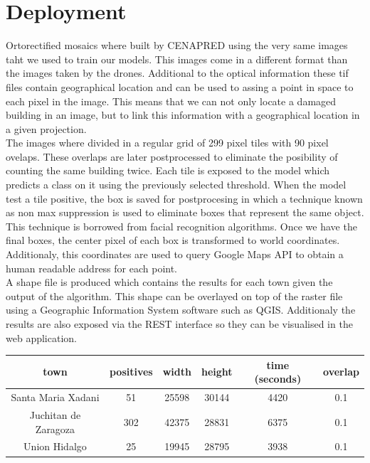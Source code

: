 \section{Deployment}

Ortorectified mosaics where built by CENAPRED using the very same images taht we used to train our models. This images come in a different format than the images taken by the drones. Additional to the optical information these tif files contain geographical location and can be used to assing a point in space to each pixel in the image. This means that we can not only locate a damaged building in an image, but to link this information with a geographical location in a given projection.\\

The images where divided in a regular grid of 299 pixel tiles with 90 pixel ovelaps. These overlaps are later postprocessed to eliminate the posibility of counting the same building twice. Each tile is exposed to the model which predicts a class on it using the previously selected threshold. When the model test a tile positive, the box is saved for postprocesing in which a technique known as non max suppression is used to eliminate boxes that represent the same object. This technique is borrowed from facial recognition algorithms. Once we have the final boxes, the center pixel of each box is transformed to world coordinates. Additionaly, this coordinates are used to query Google Maps API to obtain a human readable address for each point.\\

A shape file is produced which contains the results for each town given the output of the algorithm. This shape can be overlayed on top of the raster file using a Geographic Information System software such as QGIS. Additionaly the results are also exposed via the REST interface so they can be visualised in the web application.\\



\begin{center}
  \begin{tabular}{|c|c|c|c|c|c|}
    \hline
    town                 & positives & width & height & time (seconds) & overlap\\ \hline
    Santa Maria Xadani   &51         & 25598 & 30144  & 4420           & 0.1 \\ \hline
    Juchitan de Zaragoza &302        & 42375 & 28831  & 6375           & 0.1 \\ \hline
    Union Hidalgo        &25         & 19945 & 28795  & 3938           & 0.1\\
    \hline
  \end{tabular}
\end{center}


